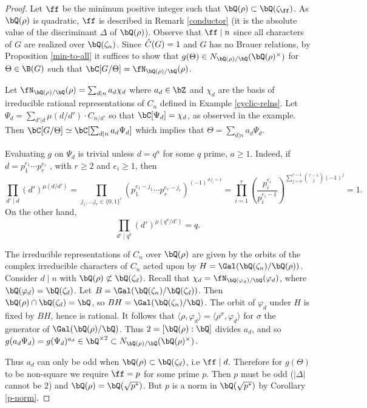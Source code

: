 \begin{proof}
    Let $\ff$ be the minimum positive integer such that $\bQ(\rho) \subset \bQ(\zeta_{\ff})$. As $\bQ(\rho)$ is quadratic, $\ff$ is described in Remark \ref{conductor} (it is the absolute value of the discriminant $\Delta$ of $\bQ(\rho)$). Observe that $\ff \mid n$ since all characters of $G$ are realized over $\bQ(\zeta_n)$. Since $\hat{C}(G) = 1$ and $G$ has no Brauer relations, by Proposition \ref{min-to-all} it suffices to show that $g(\Theta) \in \fieldnorm{\rho}$ for $\Theta \in \B(G)$ such that $\bC[G / \Theta] = \repnorm{\rho}$.

    Let $\repnorm{\rho} = \sum_{d \mid n} a_d \chi_d$ where $a_d \in \bZ$ and $\chi_d$ are the basis of irreducible rational representations of $C_n$ defined in Example \ref{cyclic-relns}. %
    Let $\Psi_{d} = \sum_{d' | d}\mu(d / d')\cdot C_{n / d'}$ so that $\bC[\Psi_{d}] = \chi_{d}$, as observed in the example. Then $\bC[G / \Theta] \simeq \bC[\sum_{d | n } a_{d} \Psi_{d}]$ which implies that $\Theta = \sum_{d | n } a_{d} \Psi_{d}$.

    Evaluating $g$ on $\Psi_{d}$ is trivial unless $d = q^a$ for some $q$ prime, $a \geq 1$. Indeed, if $d = p_1^{e_1} \cdots p_r^{e_r}$ , with $r \geq 2$ and $e_i \geq 1$, then
    \[ \prod_{d' \mid d} (d')^{\mu(d / d')} = \prod_{j_1, \ldots j_r \in \{0,1\}^r } \left(p_1^{e_1 - j_1} \cdots p_r^{e_r - j_r}\right)^{(-1)^{\# j_i = 1}} = 
    \prod_{i = 1}^r \left(\frac{p_i^{e_i}}{p_i^{e_i - 1}}\right)^{\sum_{ j = 0}^{r - 1} \binom{r-1}{j} (-1)^j} = 1. \]
    On the other hand,
    \[ \prod_{d' \mid q^a} (d')^{\mu(q^a / d')} = q .\]
    
    The irreducible representations of $C_n$ over $\bQ(\rho)$ are given by the orbits of the complex irreducible characters of $C_n$ acted upon by $H = \Gal (\bQ(\zeta_n) / \bQ(\rho))$. Consider $d \mid n$ with $\bQ(\rho) \not\subset \bQ(\zeta_d)$. 
    Recall that $\chi_d = \repnorm{\varphi_d}$, where $\bQ(\varphi_d) = \bQ(\zeta_d)$. Let $B = \Gal(\bQ(\zeta_n) / \bQ(\zeta_d))$. Then $\bQ(\rho) \cap \bQ(\zeta_d) = \bQ$, so $BH = \Gal(\bQ(\zeta_n) / \bQ)$. The orbit of $\varphi_{d}$ under $H$ is fixed by $BH$, hence is rational. It follows that $\langle \rho, \varphi_{d} \rangle = \langle \rho^{\sigma} , \varphi_{d} \rangle$ for $\sigma$ the generator of $\Gal(\bQ(\rho) / \bQ)$. Thus $2 = [\bQ(\rho) : \bQ]$ divides $a_d$, and so $g(a_d \Psi_d) = g(\Psi_d)^{a_d} \in \bQ^{\times 2} \subset \fieldnorm{\rho}$.

    Thus $a_d$ can only be odd when $\bQ(\rho) \subset \bQ(\zeta_d)$, i.e  $\ff \mid d$. Therefore for $g(\Theta)$ to be non-square we require $\ff = p$ for some prime $p$. Then $p$ must be odd ($|\Delta|$ cannot be $2$) and $\bQ(\rho) = \bQ(\sqrt{p^*})$. But $p$ is a norm in $\bQ(\sqrt{p^*})$ by Corollary \ref{p-norm}.
\end{proof}

